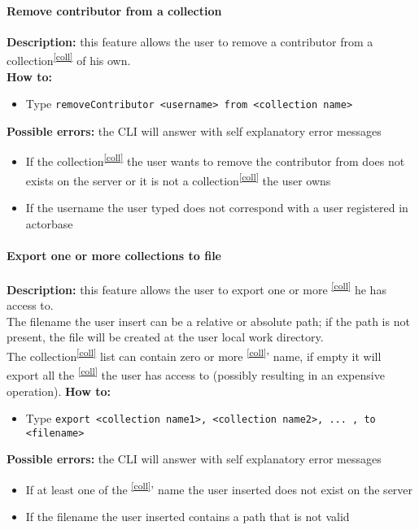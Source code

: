 \documentclass{scalatekids-article}
\begin{document}
\paragraph{Remove contributor from a collection}
\label{sec:removecontributor}
\textbf{Description:} this feature allows the user to remove a contributor from a collection\textsuperscript{\ref{coll}} of his own.\\
\textbf{How to:}
\begin{itemize}
\item Type \texttt{removeContributor <username> from <collection name>}
\end{itemize}
\textbf{Possible errors:} the CLI will answer with self explanatory error messages
\begin{itemize}
\item If the collection\textsuperscript{\ref{coll}} the user wants to remove the contributor from does not exists on the server or it is not a collection\textsuperscript{\ref{coll}} the user owns
\item If the username the user typed does not correspond with a user registered in actorbase
\end{itemize}

\paragraph{Export one or more collections to file}
\label{sec:export}
\textbf{Description:} this feature allows the user to export one or more \textsuperscript{\ref{coll}} he has access to.\\
The filename the user insert can be a relative or absolute path; if the path is not present, the file will be created at the user local work directory.\\
The collection\textsuperscript{\ref{coll}} list can contain zero or more \textsuperscript{\ref{coll}}' name, if empty it will export all the \textsuperscript{\ref{coll}} the user has access to (possibly resulting in an expensive operation).
\textbf{How to:}
\begin{itemize}
\item Type \texttt{export <collection name1>, <collection name2>, ... , to <filename>}
\end{itemize}
\textbf{Possible errors:} the CLI will answer with self explanatory error messages
\begin{itemize}
\item If at least one of the \textsuperscript{\ref{coll}}' name the user inserted does not exist on the server
\item If the filename the user inserted contains a path that is not valid
\end{itemize}
\end{document}
